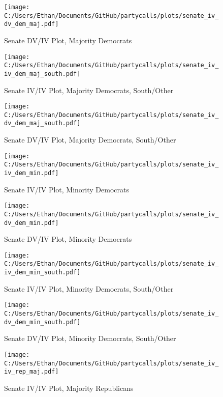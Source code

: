 \documentclass[12pt]{article}
\begin{document}
\begin{figure}[H]
	\centering
	\caption{Senate DV/IV Plot, Majority Democrats}
	\texttt{[image: C:/Users/Ethan/Documents/GitHub/partycalls/plots/senate\_iv\_dv\_dem\_maj.pdf]}
\end{figure}

\begin{figure}[H]
	\centering
	\caption{Senate IV/IV Plot, Majority Democrats, South/Other}
	\texttt{[image: C:/Users/Ethan/Documents/GitHub/partycalls/plots/senate\_iv\_iv\_dem\_maj\_south.pdf]}
\end{figure}

\begin{figure}[H]
	\centering
	\caption{Senate DV/IV Plot, Majority Democrats, South/Other}
	\texttt{[image: C:/Users/Ethan/Documents/GitHub/partycalls/plots/senate\_iv\_dv\_dem\_maj\_south.pdf]}
\end{figure}

\begin{figure}[H]
	\centering
	\caption{Senate IV/IV Plot, Minority Democrats}
	\texttt{[image: C:/Users/Ethan/Documents/GitHub/partycalls/plots/senate\_iv\_iv\_dem\_min.pdf]}
\end{figure}

\begin{figure}[H]
	\centering
	\caption{Senate DV/IV Plot, Minority Democrats}
	\texttt{[image: C:/Users/Ethan/Documents/GitHub/partycalls/plots/senate\_iv\_dv\_dem\_min.pdf]}
\end{figure}

\begin{figure}[H]
	\centering
	\caption{Senate IV/IV Plot, Minority Democrats, South/Other}
	\texttt{[image: C:/Users/Ethan/Documents/GitHub/partycalls/plots/senate\_iv\_iv\_dem\_min\_south.pdf]}
\end{figure}

\begin{figure}[H]
	\centering
	\caption{Senate DV/IV Plot, Minority Democrats, South/Other}
	\texttt{[image: C:/Users/Ethan/Documents/GitHub/partycalls/plots/senate\_iv\_dv\_dem\_min\_south.pdf]}
\end{figure}

\begin{figure}[H]
	\centering
	\caption{Senate IV/IV Plot, Majority Republicans}
	\texttt{[image: C:/Users/Ethan/Documents/GitHub/partycalls/plots/senate\_iv\_iv\_rep\_maj.pdf]}
\end{figure}
\end{document}
